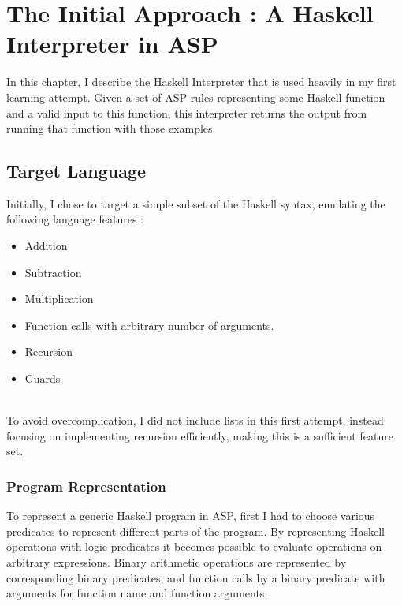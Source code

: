\chapter{The Initial Approach : A Haskell Interpreter in ASP}

In this chapter, I describe the Haskell Interpreter that is used heavily in my first learning attempt. Given a set of ASP rules representing some Haskell function and a valid input to this function, this interpreter returns the output from running that function with those examples.

\section{Target Language}

Initially, I chose to target a simple subset of the Haskell syntax, emulating the following language features :

\begin{itemize}
\item Addition
\item Subtraction
\item Multiplication
\item Function calls with arbitrary number of arguments.
\item Recursion
\item Guards
\end{itemize}
\mbox{}\\
To avoid overcomplication, I did not include lists in this first attempt, instead focusing on implementing recursion efficiently, making this is a sufficient feature set. 

\subsection{Program Representation}
To represent a generic Haskell program in ASP, first I had to choose various predicates to represent different parts of the program. By representing Haskell operations with logic predicates it becomes possible to evaluate operations on arbitrary expressions. Binary arithmetic operations are represented by corresponding binary predicates, and function calls by a binary predicate with arguments for function name and function arguments.  \\ \\

